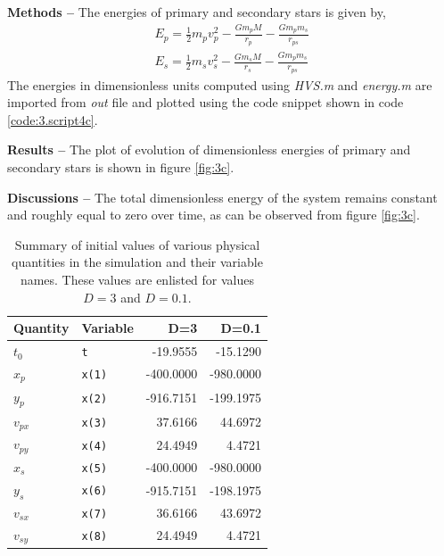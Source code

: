 \documentclass[a4paper]{article}
\begin{document}
\begin{enumerate} [label*=\textbf{(\alph*)}]
					\subitem \textbf{Methods  --}
					The energies of primary and secondary stars is given by,
					\begin{equation}
						\begin{gathered}
							E_p = \frac{1}{2} m_p v_p^2 - \frac{G m_p M}{r_p} - \frac{G m_p m_s}{r_{ps}} \\
							E_s = \frac{1}{2} m_s v_s^2 - \frac{G m_s M}{r_s} - \frac{G m_p m_s}{r_{ps}}
						\end{gathered}
					\label{eq:3-energies}
					\end{equation}
					The energies in dimensionless units computed using \emph{HVS.m} and \emph{energy.m} are imported from \emph{out} file and plotted using the code snippet shown in code \ref{code:3.script4c}. 
					
					\subitem \textbf{Results  --}
					The plot of evolution of dimensionless energies of primary and secondary stars is shown in figure \ref{fig:3c}.
					
					\subitem \textbf{Discussions  --}
					The total dimensionless energy of the system remains constant and roughly equal to zero over time, as can be observed from figure \ref{fig:3c}.
	
					
				\begin{table}
					\centering
					\begin{tabular} {l l r r}
						\toprule
						\textbf{Quantity} & \textbf{Variable} & \textbf{D=3} & \textbf{D=0.1}\\
						\midrule
						\(t^{}_{0}\) & \texttt{t} & -19.9555 & -15.1290 \\
						\(x^{}_{p}\) & \texttt{x(1)}& -400.0000 & -980.0000 \\
						\(y^{}_{p}\) & \texttt{x(2)} & -916.7151 & -199.1975 \\
						\(v^{}_{px}\) & \texttt{x(3)} & 37.6166 & 44.6972 \\
						\(v^{}_{py}\) & \texttt{x(4)} & 24.4949 & 4.4721 \\
						\(x^{}_{s}\) & \texttt{x(5)} & -400.0000 & -980.0000 \\
						\(y^{}_{s}\) & \texttt{x(6)} & -915.7151 & -198.1975 \\
						\(v^{}_{sx}\) & \texttt{x(7)} & 36.6166 & 43.6972 \\
						\(v^{}_{sy}\) & \texttt{x(8)} & 24.4949 & 4.4721 \\
						\bottomrule
					\end{tabular}
					\caption{Summary of initial values of various physical quantities in the simulation and their variable names. These values are enlisted for values \(D=3\) and \(D=0.1\).}
					\label{table:3_dvalues}
				\end{table}
			

\end{enumerate}
\end{document}

